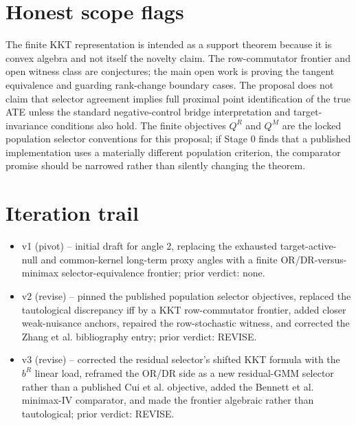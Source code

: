 \documentclass[11pt]{article}
\theoremstyle{definition}
\theoremstyle{plain}
\theoremstyle{remark}
\begin{document}
\section{Honest scope flags}
The finite KKT representation is intended as a support theorem because it is convex algebra and not itself the novelty claim. The row-commutator frontier and open witness class are conjectures; the main open work is proving the tangent equivalence and guarding rank-change boundary cases. The proposal does not claim that selector agreement implies full proximal point identification of the true ATE unless the standard negative-control bridge interpretation and target-invariance conditions also hold. The finite objectives \(Q^R\) and \(Q^M\) are the locked population selector conventions for this proposal; if Stage 0 finds that a published implementation uses a materially different population criterion, the comparator promise should be narrowed rather than silently changing the theorem.

\section{Iteration trail}
\begin{itemize}[leftmargin=*]
\item v1 (pivot) -- initial draft for angle 2, replacing the exhausted target-active-null and common-kernel long-term proxy angles with a finite OR/DR-versus-minimax selector-equivalence frontier; prior verdict: none.
\item v2 (revise) -- pinned the published population selector objectives, replaced the tautological discrepancy iff by a KKT row-commutator frontier, added closer weak-nuisance anchors, repaired the row-stochastic witness, and corrected the Zhang et al. bibliography entry; prior verdict: REVISE.
\item v3 (revise) -- corrected the residual selector's shifted KKT formula with the \(b^R\) linear load, reframed the OR/DR side as a new residual-GMM selector rather than a published Cui et al. objective, added the Bennett et al. minimax-IV comparator, and made the frontier algebraic rather than tautological; prior verdict: REVISE.
\end{itemize}
\end{document}
